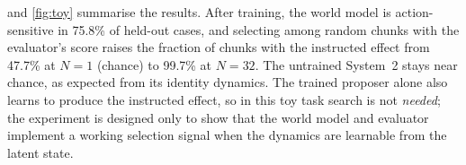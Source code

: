  and \cref{fig:toy} summarise the results. After training, the world model is action-sensitive in 75.8\% of held-out cases, and selecting among random chunks with the evaluator's score raises the fraction of chunks with the instructed effect from 47.7\% at $N{=}1$ (chance) to 99.7\% at $N{=}32$. The untrained System~2 stays near chance, as expected from its identity dynamics. The trained proposer alone also learns to produce the instructed effect, so in this toy task search is not \emph{needed}; the experiment is designed only to show that the world model and evaluator implement a working selection signal when the dynamics are learnable from the latent state.
